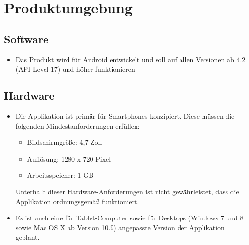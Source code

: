 \section{Produktumgebung}

\subsection{Software}
\begin{itemize}
	\item Das Produkt wird für Android entwickelt und soll auf allen Versionen ab 4.2 (API Level 17) und höher funktionieren.
\end{itemize}

\subsection{Hardware}
\begin{itemize}
	\item Die Applikation ist primär für Smartphones konzipiert. Diese müssen die folgenden Mindestanforderungen erfüllen:
	\begin{itemize}
		\item Bildschirmgröße: 4,7 Zoll
		\item Auflösung: 1280 x 720 Pixel
		\item Arbeitsspeicher: 1 GB
	\end{itemize}
	Unterhalb dieser Hardware-Anforderungen ist nicht gewährleistet, dass die Applikation ordnungsgemäß funktioniert.
	\item Es ist auch eine für Tablet-Computer sowie für Desktops (Windows 7 und 8 sowie Mac OS X ab Version 10.9) angepasste Version der Applikation geplant.
\end{itemize}
